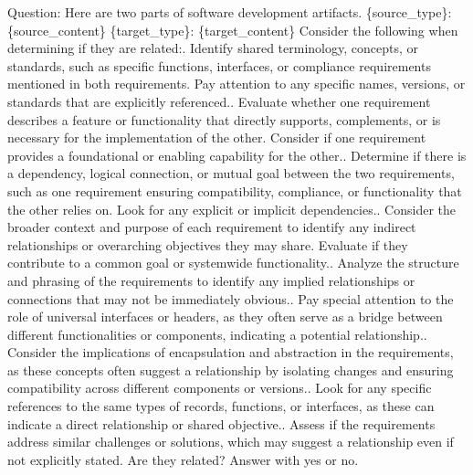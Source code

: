 Question: Here are two parts of software development artifacts.\newline
\newline
\{source\_type\}: \textquotesingle{}\textquotesingle{}\textquotesingle{}\{source\_content\}\textquotesingle{}\textquotesingle{}\textquotesingle{}\newline
\newline
\{target\_type\}: \textquotesingle{}\textquotesingle{}\textquotesingle{}\{target\_content\}\textquotesingle{}\textquotesingle{}\textquotesingle{}\newline
\newline
Consider the following when determining if they are related:. Identify shared terminology, concepts, or standards, such as specific functions, interfaces, or compliance requirements mentioned in both requirements. Pay attention to any specific names, versions, or standards that are explicitly referenced.. Evaluate whether one requirement describes a feature or functionality that directly supports, complements, or is necessary for the implementation of the other. Consider if one requirement provides a foundational or enabling capability for the other.. Determine if there is a dependency, logical connection, or mutual goal between the two requirements, such as one requirement ensuring compatibility, compliance, or functionality that the other relies on. Look for any explicit or implicit dependencies.. Consider the broader context and purpose of each requirement to identify any indirect relationships or overarching objectives they may share. Evaluate if they contribute to a common goal or system\-wide functionality.. Analyze the structure and phrasing of the requirements to identify any implied relationships or connections that may not be immediately obvious.. Pay special attention to the role of universal interfaces or headers, as they often serve as a bridge between different functionalities or components, indicating a potential relationship.. Consider the implications of encapsulation and abstraction in the requirements, as these concepts often suggest a relationship by isolating changes and ensuring compatibility across different components or versions.. Look for any specific references to the same types of records, functions, or interfaces, as these can indicate a direct relationship or shared objective.. Assess if the requirements address similar challenges or solutions, which may suggest a relationship even if not explicitly stated.\newline
\newline
Are they related?\newline
\newline
Answer with \textquotesingle{}yes\textquotesingle{} or \textquotesingle{}no\textquotesingle{}.